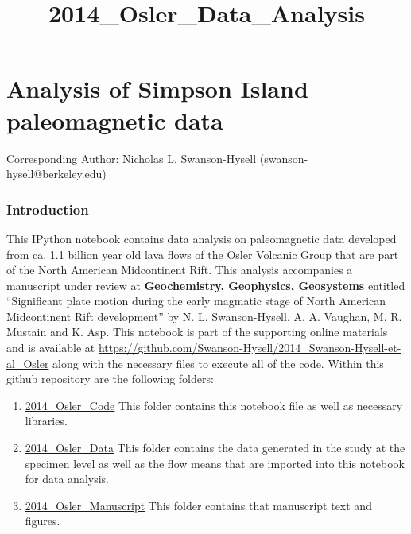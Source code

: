 \documentclass[letterpaper,10pt,english]{/Users/polarwander/Library/Enthought/Canopy_64bit/User/lib/python2.7/site-packages/sphinx/texinputs/sphinxhowto}
\title{2014\_Osler\_Data\_Analysis}
\begin{document}
        
            \maketitle
        

        


        
        \part{Analysis of Simpson Island paleomagnetic data}Corresponding Author: Nicholas L. Swanson-Hysell
(swanson-hysell@berkeley.edu)\section{Introduction}This IPython notebook contains data analysis on paleomagnetic data
developed from ca. 1.1 billion year old lava flows of the Osler Volcanic
Group that are part of the North American Midcontinent Rift. This
analysis accompanies a manuscript under review at \textbf{Geochemistry,
Geophysics, Geosystems} entitled ``Significant plate motion during the
early magmatic stage of North American Midcontinent Rift development''
by N. L. Swanson-Hysell, A. A. Vaughan, M. R. Mustain and K. Asp. This
notebook is part of the supporting online materials and is available at
\url{https://github.com/Swanson-Hysell/2014_Swanson-Hysell-et-al_Osler}
along with the necessary files to execute all of the code. Within this
github repository are the following folders:

\begin{enumerate}
\def\labelenumi{\arabic{enumi}.}
\itemsep1pt\parskip0pt
\item
  \href{https://github.com/Swanson-Hysell/2014_Swanson-Hysell-et-al_Osler/tree/master/2014_Osler_Code}{2014\_Osler\_Code}
  This folder contains this notebook file as well as necessary
  libraries.
\item
  \href{https://github.com/Swanson-Hysell/2014_Swanson-Hysell-et-al_Osler/tree/master/2014_Osler_Data}{2014\_Osler\_Data}
  This folder contains the data generated in the study at the specimen
  level as well as the flow means that are imported into this notebook
  for data analysis.
\item
  \href{https://github.com/Swanson-Hysell/2014_Swanson-Hysell-et-al_Osler/tree/master/2014_Osler_Manuscript}{2014\_Osler\_Manuscript}
  This folder contains that manuscript text and figures.
\end{enumerate}
\end{document}
